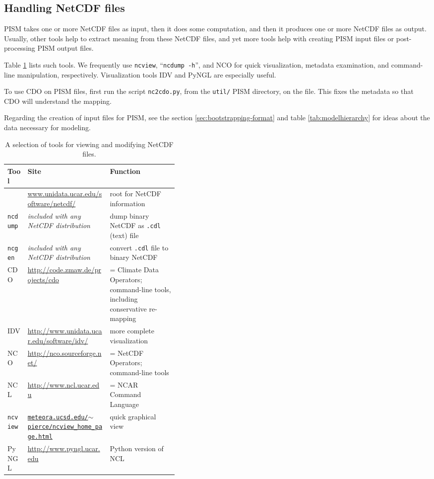 \subsection{Handling NetCDF files}\label{subsect:nctoolsintro}  PISM takes one or more NetCDF files as input, then it does some computation, and then it produces one or more NetCDF files as output.  Usually, other tools help to extract meaning from these NetCDF files, and yet more tools help with creating PISM input files or post-processing PISM output files.

Table \ref{tab:NetCDFview} lists such tools.  We frequently use \texttt{ncview}, ``\texttt{ncdump -h}'', and NCO for quick visualization, metadata examination, and command-line manipulation, respectively.  Visualization tools IDV and PyNGL are especially useful.  

To use CDO on PISM files, first run the script \texttt{nc2cdo.py}, from the \texttt{util/} PISM directory, on the file.  This fixes the metadata so that CDO will understand the mapping.

Regarding the creation of input files for PISM, see the section \ref{sec:bootstrapping-format} and table \ref{tab:modelhierarchy} for ideas about the data necessary for modeling.

\newcommand{\netcdftool}[1]{#1\index{NetCDF!tools!#1}}
\begin{table}[ht]
\centering
\small
\begin{tabular}{llp{0.4\linewidth}}
  \toprule
  \textbf{Tool} & \textbf{Site} & \textbf{Function} \\
  \midrule
  & \url{www.unidata.ucar.edu/software/netcdf/} & root for NetCDF information \\
  \midrule
  \netcdftool{\texttt{ncdump}} & \emph{included with any NetCDF distribution} & dump binary NetCDF as \texttt{.cdl} (text) file \\
  \netcdftool{\texttt{ncgen}} & \emph{included with any NetCDF distribution} & convert \texttt{.cdl} file to binary NetCDF \\
  \midrule
  \netcdftool{CDO} & \url{http://code.zmaw.de/projects/cdo} & = Climate Data Operators; command-line tools, including conservative re-mapping \\
  \netcdftool{IDV} & \url{http://www.unidata.ucar.edu/software/idv/} & more complete visualization \\
  \netcdftool{NCO}\index{NCO (NetCDF Operators)} & \url{http://nco.sourceforge.net/} & = NetCDF Operators; command-line tools\\
  \netcdftool{NCL} &  \url{http://www.ncl.ucar.edu} & = NCAR Command Language\\
  \netcdftool{\texttt{ncview}} & \href{http://meteora.ucsd.edu/~pierce/ncview_home_page.html}{\texttt{meteora.ucsd.edu/$\sim$pierce/ncview_home_page.html}} & quick graphical view \\
  \netcdftool{PyNGL} &  \url{http://www.pyngl.ucar.edu} & Python version of NCL\\
  \bottomrule
\end{tabular}
\normalsize
\caption{A selection of tools for viewing and modifying NetCDF files.}
\label{tab:NetCDFview}
\end{table}




